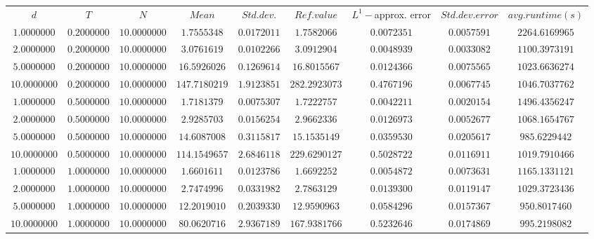 \begin{tabular}{ccccccccc}
$d$ & $T$ & $N$ & $Mean$ & $Std. dev.$ & $Ref. value$ & $L^1-$approx. error & $Std. dev. error$ & $avg. runtime (s)$\\
$1.0000000$ & $0.2000000$ & $10.0000000$ & $1.7555348$ & $0.0172011$ & $1.7582066$ & $0.0072351$ & $0.0057591$ & $2264.6169965$\\
$2.0000000$ & $0.2000000$ & $10.0000000$ & $3.0761619$ & $0.0102266$ & $3.0912904$ & $0.0048939$ & $0.0033082$ & $1100.3973191$\\
$5.0000000$ & $0.2000000$ & $10.0000000$ & $16.5926026$ & $0.1269614$ & $16.8015567$ & $0.0124366$ & $0.0075565$ & $1023.6636274$\\
$10.0000000$ & $0.2000000$ & $10.0000000$ & $147.7180219$ & $1.9123851$ & $282.2923073$ & $0.4767196$ & $0.0067745$ & $1046.7037762$\\
$1.0000000$ & $0.5000000$ & $10.0000000$ & $1.7181379$ & $0.0075307$ & $1.7222757$ & $0.0042211$ & $0.0020154$ & $1496.4356247$\\
$2.0000000$ & $0.5000000$ & $10.0000000$ & $2.9285703$ & $0.0156254$ & $2.9662336$ & $0.0126973$ & $0.0052677$ & $1068.1654767$\\
$5.0000000$ & $0.5000000$ & $10.0000000$ & $14.6087008$ & $0.3115817$ & $15.1535149$ & $0.0359530$ & $0.0205617$ & $985.6229442$\\
$10.0000000$ & $0.5000000$ & $10.0000000$ & $114.1549657$ & $2.6846118$ & $229.6290127$ & $0.5028722$ & $0.0116911$ & $1019.7910466$\\
$1.0000000$ & $1.0000000$ & $10.0000000$ & $1.6601611$ & $0.0123786$ & $1.6692252$ & $0.0054872$ & $0.0073631$ & $1165.1331121$\\
$2.0000000$ & $1.0000000$ & $10.0000000$ & $2.7474996$ & $0.0331982$ & $2.7863129$ & $0.0139300$ & $0.0119147$ & $1029.3723436$\\
$5.0000000$ & $1.0000000$ & $10.0000000$ & $12.2019010$ & $0.2039330$ & $12.9590963$ & $0.0584296$ & $0.0157367$ & $950.8017460$\\
$10.0000000$ & $1.0000000$ & $10.0000000$ & $80.0620716$ & $2.9367189$ & $167.9381766$ & $0.5232646$ & $0.0174869$ & $995.2198082$\\
\end{tabular}
